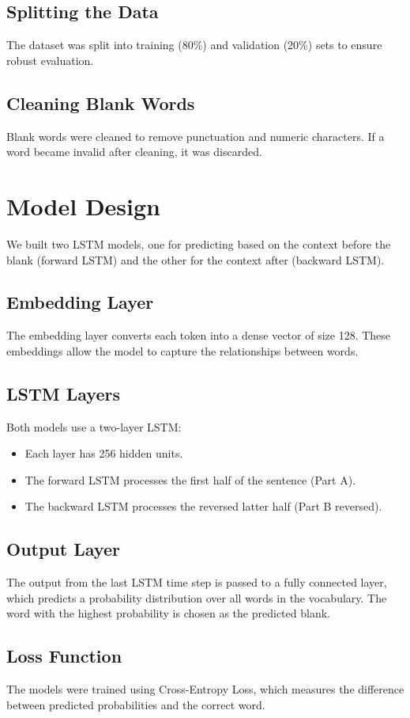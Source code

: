 \documentclass{article}
\begin{document}
\subsection{Splitting the Data}
The dataset was split into training (80\%) and validation (20\%) sets to ensure robust evaluation.

\subsection{Cleaning Blank Words}
Blank words were cleaned to remove punctuation and numeric characters. If a word became invalid after cleaning, it was discarded.

\section{Model Design}
We built two LSTM models, one for predicting based on the context before the blank (forward LSTM) and the other for the context after (backward LSTM).

\subsection{Embedding Layer}
The embedding layer converts each token into a dense vector of size 128. These embeddings allow the model to capture the relationships between words.

\subsection{LSTM Layers}
Both models use a two-layer LSTM:
\begin{itemize}
    \item Each layer has 256 hidden units.
    \item The forward LSTM processes the first half of the sentence (Part A).
    \item The backward LSTM processes the reversed latter half (Part B reversed).
\end{itemize}

\subsection{Output Layer}
The output from the last LSTM time step is passed to a fully connected layer, which predicts a probability distribution over all words in the vocabulary. The word with the highest probability is chosen as the predicted blank.

\subsection{Loss Function}
The models were trained using Cross-Entropy Loss, which measures the difference between predicted probabilities and the correct word.
\end{document}
